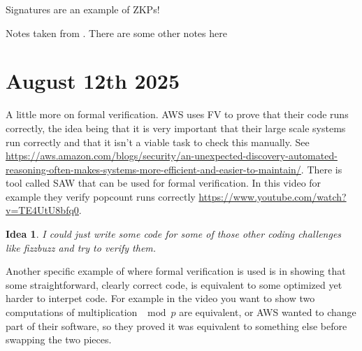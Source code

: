 \documentclass{amsart}
\newtheorem{idea}[theorem]{Idea}
\theoremstyle{definition}
\begin{document}
Signatures are an example of ZKPs! 

Notes taken from \cite[Chapter 7]{Wong}. There are some other notes here

\section{August 12th 2025}

A little more on formal verification. AWS uses FV to prove that their code runs correctly, the idea being that it is very important that their large scale systems run correctly and that it isn't a viable task to check this manually. See \url{https://aws.amazon.com/blogs/security/an-unexpected-discovery-automated-reasoning-often-makes-systems-more-efficient-and-easier-to-maintain/}.  There is tool called SAW that can be used for formal verification. In this video for example they verify popcount runs correctly \url{https://www.youtube.com/watch?v=TE4UtU8bfq0}.
\begin{idea}
    I could just write some code for some of those other coding challenges like fizzbuzz and try to verify them.
\end{idea}
Another specific example of where formal verification is used is in showing that some straightforward, clearly correct code, is equivalent to some optimized yet harder to interpet code. For example in the video you want to show two computations of multiplication $\mod p$ are equivalent, or AWS wanted to change part of their software, so they proved it was equivalent to something else before swapping the two pieces.
\end{document}
